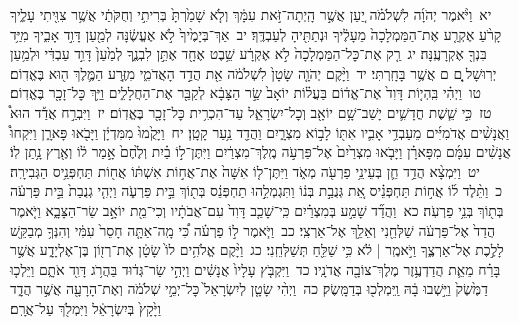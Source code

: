 \documentclass[18pt]{article}
\begin{document}
 {\loc יא~}וַיֹּ֨אמֶר יְהֹוָ֜ה לִשְׁלֹמֹ֗ה יַ֚עַן אֲשֶׁ֣ר הָֽיְתָה־זֹּ֣את עִמָּ֔ךְ וְלֹ֤א שָׁמַ֙רְתָּ֙ בְּרִיתִ֣י וְחֻקֹּתַ֔י אֲשֶׁ֥ר צִוִּ֖יתִי עָלֶ֑יךָ קָרֹ֨עַ אֶקְרַ֤ע אֶת־הַמַּמְלָכָה֙ מֵעָלֶ֔יךָ וּנְתַתִּ֖יהָ לְעַבְדֶּֽךָ׃ \startlock
 {\loc יב~}אַךְ־בְּיָמֶ֙יךָ֙ לֹ֣א אֶעֱשֶׂ֔נָּה לְמַ֖עַן דָּוִ֣ד אָבִ֑יךָ מִיַּ֥ד בִּנְךָ֖ אֶקְרָעֶֽנָּה׃ \startlock
 {\loc יג~}רַ֤ק אֶת־כׇּל־הַמַּמְלָכָה֙ לֹ֣א אֶקְרָ֔ע שֵׁ֥בֶט אֶחָ֖ד אֶתֵּ֣ן לִבְנֶ֑ךָ לְמַ֙עַן֙ דָּוִ֣ד עַבְדִּ֔י וּלְמַ֥עַן יְרֽוּשָׁל ַ֖͏ְם ם אֲשֶׁ֥ר בָּחָֽרְתִּי׃ \startlock
 {\loc יד~}וַיָּ֨קֶם יְהֹוָ֤ה שָׂטָן֙ לִשְׁלֹמֹ֔ה אֵ֖ת הֲדַ֣ד הָאֲדֹמִ֑י מִזֶּ֧רַע הַמֶּ֛לֶךְ ה֖וּא בֶּאֱדֽוֹם׃ \startlock
 {\loc טו~}וַיְהִ֗י בִּֽהְי֤וֹת דָּוִד֙ אֶת־אֱד֔וֹם בַּעֲל֗וֹת יוֹאָב֙ שַׂ֣ר הַצָּבָ֔א לְקַבֵּ֖ר אֶת־הַחֲלָלִ֑ים וַיַּ֥ךְ כׇּל־זָכָ֖ר בֶּאֱדֽוֹם׃ \startlock
 {\loc טז~}כִּ֣י שֵׁ֧שֶׁת חֳדָשִׁ֛ים יָשַׁב־שָׁ֥ם יוֹאָ֖ב וְכׇל־יִשְׂרָאֵ֑ל עַד־הִכְרִ֥ית כׇּל־זָכָ֖ר בֶּאֱדֽוֹם׃ \startlock
 {\loc יז~}וַיִּבְרַ֣ח אֲדַ֡ד הוּא֩ וַאֲנָשִׁ֨ים אֲדֹמִיִּ֜ים מֵעַבְדֵ֥י אָבִ֛יו אִתּ֖וֹ לָב֣וֹא מִצְרָ֑יִם וַהֲדַ֖ד נַ֥עַר קָטָֽן׃ \startlock
 {\loc יח~}וַיָּקֻ֙מוּ֙ מִמִּדְיָ֔ן וַיָּבֹ֖אוּ פָּארָ֑ן וַיִּקְחוּ֩ אֲנָשִׁ֨ים עִמָּ֜ם מִפָּארָ֗ן וַיָּבֹ֤אוּ מִצְרַ֙יִם֙ אֶל־פַּרְעֹ֣ה מֶֽלֶךְ־מִצְרַ֔יִם וַיִּתֶּן־ל֣וֹ בַ֗יִת וְלֶ֙חֶם֙ אָ֣מַר ל֔וֹ וְאֶ֖רֶץ נָ֥תַן לֽוֹ׃ \startlock
 {\loc יט~}וַיִּמְצָ֨א הֲדַ֥ד חֵ֛ן בְּעֵינֵ֥י פַרְעֹ֖ה מְאֹ֑ד וַיִּתֶּן־ל֤וֹ אִשָּׁה֙ אֶת־אֲח֣וֹת אִשְׁתּ֔וֹ אֲח֖וֹת תַּחְפְּנֵ֥יס הַגְּבִירָֽה׃ \startlock
 {\loc כ~}וַתֵּ֨לֶד ל֜וֹ אֲח֣וֹת תַּחְפְּנֵ֗יס אֵ֚ת גְּנֻבַ֣ת בְּנ֔וֹ וַתִּגְמְלֵ֣הוּ תַחְפְּנֵ֔ס בְּת֖וֹךְ בֵּ֣ית פַּרְעֹ֑ה וַיְהִ֤י גְנֻבַת֙ בֵּ֣ית פַּרְעֹ֔ה בְּת֖וֹךְ בְּנֵ֥י פַרְעֹֽה׃ \startlock
 {\loc כא~}וַהֲדַ֞ד שָׁמַ֣ע בְּמִצְרַ֗יִם כִּֽי־שָׁכַ֤ב דָּוִד֙ עִם־אֲבֹתָ֔יו וְכִי־מֵ֖ת יוֹאָ֣ב שַׂר־הַצָּבָ֑א וַיֹּ֤אמֶר הֲדַד֙ אֶל־פַּרְעֹ֔ה שַׁלְּחֵ֖נִי וְאֵלֵ֥ךְ אֶל־אַרְצִֽי׃ \startlock
 {\loc כב~}וַיֹּ֧אמֶר ל֣וֹ פַרְעֹ֗ה כִּ֠י מָֽה־אַתָּ֤ה חָסֵר֙ עִמִּ֔י וְהִנְּךָ֥ מְבַקֵּ֖שׁ לָלֶ֣כֶת אֶל־אַרְצֶ֑ךָ וַיֹּ֣אמֶֽר  |  לֹ֔א כִּ֥י שַׁלֵּ֖חַ תְּשַׁלְּחֵֽנִי׃ \startlock
 {\loc כג~}וַיָּ֨קֶם אֱלֹהִ֥ים לוֹ֙ שָׂטָ֔ן אֶת־רְז֖וֹן בֶּן־אֶלְיָדָ֑ע אֲשֶׁ֣ר בָּרַ֗ח מֵאֵ֛ת הֲדַדְעֶ֥זֶר מֶלֶךְ־צוֹבָ֖ה אֲדֹנָֽיו׃ \startlock
 {\loc כד~}וַיִּקְבֹּ֤ץ עָלָיו֙ אֲנָשִׁ֔ים וַיְהִ֣י שַׂר־גְּד֔וּד בַּהֲרֹ֥ג דָּוִ֖ד אֹתָ֑ם וַיֵּלְכ֤וּ דַמֶּ֙שֶׂק֙ וַיֵּ֣שְׁבוּ בָ֔הּ וַֽיִּמְלְכ֖וּ בְּדַמָּֽשֶׂק׃ \startlock
 {\loc כה~}וַיְהִ֨י שָׂטָ֤ן לְיִשְׂרָאֵל֙ כׇּל־יְמֵ֣י שְׁלֹמֹ֔ה וְאֶת־הָרָעָ֖ה אֲשֶׁ֣ר הֲדָ֑ד וַיָּ֙קָץ֙ בְּיִשְׂרָאֵ֔ל וַיִּמְלֹ֖ךְ עַל־אֲרָֽם׃ \startlock
\end{document}
